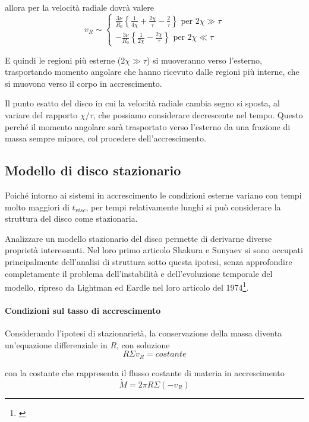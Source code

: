 \documentclass[a4paperbi]{article}
\begin{document}
	allora per la velocità radiale dovrà valere
	\begin{equation*}
		v_R\sim\begin{cases}
			\frac{3\nu}{R_0}\left\{\frac{1}{4\chi}+\frac{2\chi}{\tau}-\frac{2}{\tau}\right\}\text{ per $2\chi\gg\tau$}\\
			-\frac{3\nu}{R_0}\left\{\frac{1}{2\chi}-\frac{2\chi}{\tau}\right\}\text{ per $2\chi\ll\tau$}			
			\end{cases}
	\end{equation*}
	
	E quindi le regioni più esterne ($2\chi\gg\tau$) si muoveranno verso l'esterno, trasportando momento angolare che hanno ricevuto dalle regioni più interne, che si muovono verso il corpo in accrescimento.
	
	Il punto esatto del disco in cui la velocità radiale cambia segno si sposta, al variare del rapporto $\chi/\tau$, che possiamo considerare decrescente nel tempo. Questo perché il momento angolare sarà trasportato verso l'esterno da una frazione di massa sempre minore, col procedere dell'accrescimento.
	
\subsection{Modello di disco stazionario}
	Poiché intorno ai sistemi in accrescimento le condizioni esterne variano con tempi molto maggiori di $t_{visc}$, per tempi relativamente lunghi si può considerare la struttura del disco come stazionaria.
	
	Analizzare un modello stazionario del disco permette di derivarne diverse proprietà interessanti. Nel loro primo articolo Shakura e Sunyaev si sono occupati principalmente dell'analisi di struttura sotto questa ipotesi, senza approfondire completamente il problema dell'instabilità e dell'evoluzione temporale del modello, ripreso da Lightman ed Eardle nel loro articolo del 1974\footnote{\cite{LightmanEardley1974}}.
	
	\paragraph{Condizioni sul tasso di accrescimento}
	Considerando l'ipotesi di stazionarietà, la conservazione della massa diventa un'equazione differenziale in $R$, con soluzione
	\begin{equation}
		R\Sigma v_R=costante
	\end{equation}
	
	con la costante che rappresenta il flusso costante di materia in accrescimento
	\begin{equation}
		\dot{M}=2\pi R\Sigma(-v_R)
	\end{equation}
	
\end{document}
